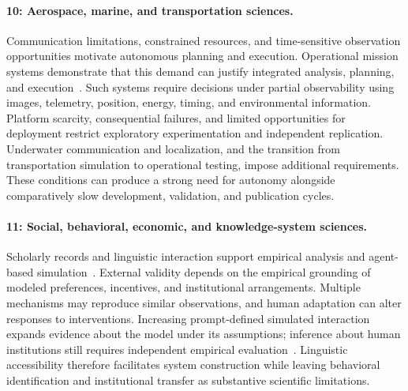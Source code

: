 \paragraph{10: Aerospace, marine, and transportation sciences.}
Communication limitations, constrained resources, and time-sensitive observation opportunities motivate autonomous planning and execution. Operational mission systems demonstrate that this demand can justify integrated analysis, planning, and execution~\cite{asd0645}. Such systems require decisions under partial observability using images, telemetry, position, energy, timing, and environmental information. Platform scarcity, consequential failures, and limited opportunities for deployment restrict exploratory experimentation and independent replication. Underwater communication and localization, and the transition from transportation simulation to operational testing, impose additional requirements. These conditions can produce a strong need for autonomy alongside comparatively slow development, validation, and publication cycles.

\paragraph{11: Social, behavioral, economic, and knowledge-system sciences.}
Scholarly records and linguistic interaction support empirical analysis and agent-based simulation~\cite{asd0624,asd0652,asd0786}. External validity depends on the empirical grounding of modeled preferences, incentives, and institutional arrangements. Multiple mechanisms may reproduce similar observations, and human adaptation can alter responses to interventions. Increasing prompt-defined simulated interaction expands evidence about the model under its assumptions; inference about human institutions still requires independent empirical evaluation~\cite{asd0786}. Linguistic accessibility therefore facilitates system construction while leaving behavioral identification and institutional transfer as substantive scientific limitations.

